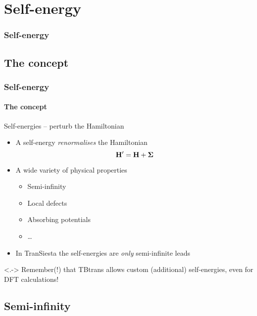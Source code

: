 \section{Self-energy}

\begin{framenologo}
  \frametitle{Self-energy}
  \tableofcontents[currentsection]
\end{framenologo}

\subsection{The concept}

\begin{frame}
  \frametitle{Self-energy}
  \framesubtitle{The concept}

  \begin{block}{Self-energies -- perturb the Hamiltonian}
    
    \begin{itemize}[<+->]
      \item A self-energy \emph{renormalises} the Hamiltonian
      \begin{equation*}
        \mathbf{H}' = \mathbf{H} + \boldsymbol{\Sigma}
      \end{equation*}
      \item A wide variety of physical properties
      \begin{itemize}[<.->]
        \item Semi-infinity
        \item Local defects
        \item Absorbing potentials
        \item \dots
      \end{itemize}
      \item In TranSiesta the self-energies are \emph{only} semi-infinite leads
    \end{itemize}

    \uncover<.->{
        Remember(!) that TBtrans allows custom (additional) self-energies, even for DFT calculations!
    }

  \end{block}

\end{frame}

\subsection{Semi-infinity}

